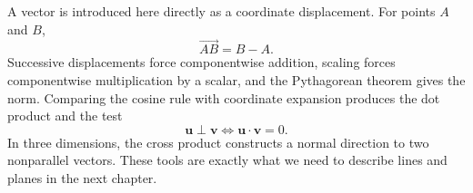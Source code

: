 \begin{summarybox}
A vector is introduced here directly as a coordinate displacement.
For points $A$ and $B$,
\[
\overrightarrow{AB}=B-A.
\]
Successive displacements force componentwise addition, scaling forces
componentwise multiplication by a scalar, and the Pythagorean theorem gives the
norm.  Comparing the cosine rule with coordinate expansion produces the dot
product and the test
\[
\mathbf u\perp\mathbf v
\iff
\mathbf u\cdot\mathbf v=0.
\]
In three dimensions, the cross product constructs a normal direction to two
nonparallel vectors.  These tools are exactly what we need to describe lines
and planes in the next chapter.
\end{summarybox}
